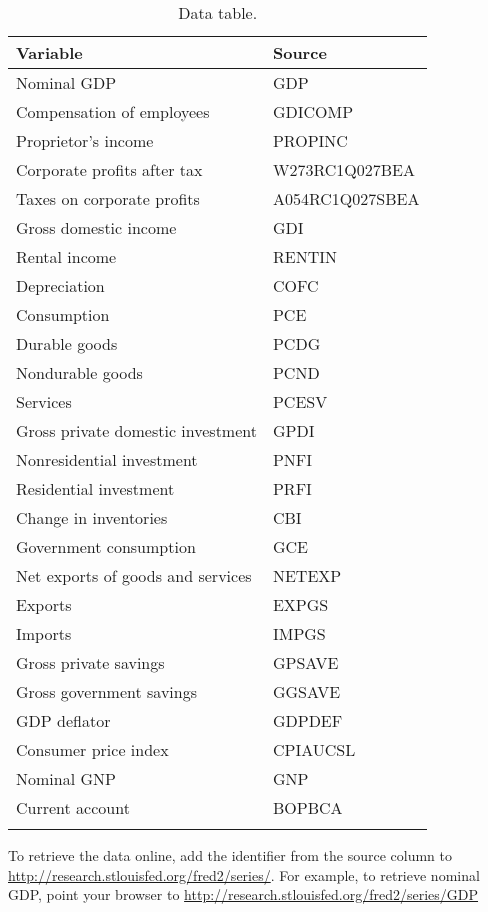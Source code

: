 \begin{table}[H]
\centering
\caption{Data table.}
\begin{tabular*}{0.95\textwidth}{l@{\extracolsep{\fill}}l}
\toprule
Variable & Source\\
\midrule
Nominal GDP                        &GDP \\
Compensation of employees        &GDICOMP\\
Proprietor's income                &PROPINC\\
Corporate profits  after tax              &W273RC1Q027BEA\\
Taxes on corporate profits      & A054RC1Q027SBEA \\
Gross domestic income           & GDI \\
Rental income                    &RENTIN\\
Depreciation                    &COFC\\
Consumption                     &PCE\\
Durable goods                     &PCDG\\
Nondurable goods                &PCND\\
Services                        &PCESV\\
Gross private domestic investment    &GPDI\\
Nonresidential investment         &PNFI\\
Residential investment            &PRFI\\
Change in inventories            &CBI\\
Government consumption            &GCE\\
Net exports of goods and services    &NETEXP\\
Exports                            &EXPGS\\
Imports                            &IMPGS\\
Gross private savings            &GPSAVE\\
Gross government savings        &GGSAVE\\
GDP deflator                    &GDPDEF\\
Consumer price index             &CPIAUCSL\\
Nominal GNP                        &GNP\\
Current account                    &BOPBCA\\
\bottomrule
\addlinespace
\end{tabular*}
\begin{minipage}{0.95\textwidth}
\footnotesize{To retrieve the data online, add the identifier from the source column to \url{http://research.stlouisfed.org/fred2/series/}.  For example, to retrieve nominal GDP, point your browser to \url{http://research.stlouisfed.org/fred2/series/GDP}}
\end{minipage}
\end{table}
